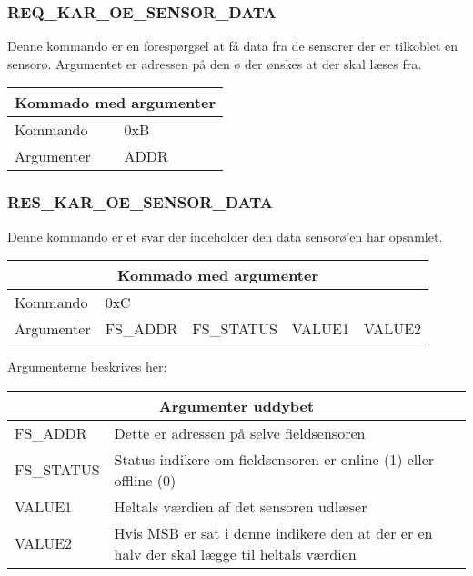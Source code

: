 \subsubsection{REQ\_KAR\_OE\_SENSOR\_DATA}
Denne kommando er en forespørgsel at få data fra de sensorer der er tilkoblet en sensorø. Argumentet er adressen på den ø der ønskes at der skal læses fra.

\begin{table}[H]
\setlength{\parindent}{12pt}
\begin{tabular}{|l|lcc|}
\hline
\multicolumn{4}{|c|}{Kommado med argumenter}\\\hline
Kommando & 0xB & & \\
Argumenter & ADDR & & \\\hline
\end{tabular}
\end{table}


\subsubsection{RES\_KAR\_OE\_SENSOR\_DATA}
Denne kommando er et svar der indeholder den data sensorø'en har opsamlet.

\begin{table}[H]
\setlength{\parindent}{12pt}
\begin{tabular}{|l|lccc|}
\hline
\multicolumn{5}{|c|}{Kommado med argumenter}\\\hline
Kommando & 0xC & & & \\
Argumenter & FS\_ADDR & FS\_STATUS & VALUE1 & VALUE2 \\\hline
\end{tabular}
\end{table}

Argumenterne beskrives her:

\begin{table}[H]
\setlength{\parindent}{12pt}
\begin{tabular}{|l|l|}
\hline
\multicolumn{2}{|c|}{Argumenter uddybet}\\\hline
FS\_ADDR 	& Dette er adressen på selve fieldsensoren \\
FS\_STATUS	& Status indikere om fieldsensoren er online (1) eller offline (0) \\
VALUE1 		& Heltals værdien af det sensoren udlæser \\
VALUE2 		& Hvis MSB er sat i denne indikere den at der er en halv der skal lægge til heltals værdien \\\hline
\end{tabular}
\end{table}

